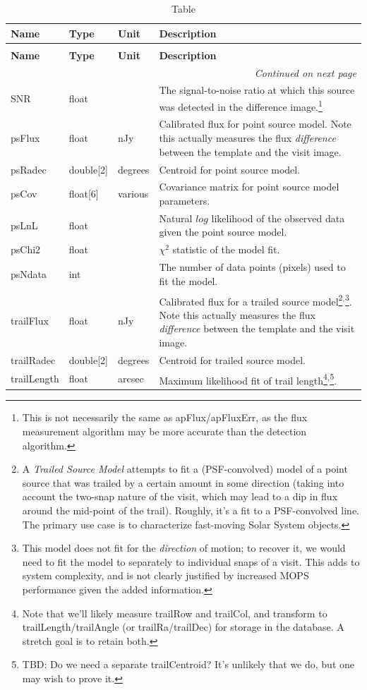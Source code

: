 \documentclass[SE,lsstdraft,toc]{lsstdoc}
\newenvironment{schema}[3]{%
\setlength\LTleft{0pt}
\setlength\LTright{\fill}
\begin{longtable}{p{0.2\textwidth}p{0.14\textwidth}p{0.14\textwidth}p{0.41\textwidth}}

\caption[#1]{#2\label{#3}}\\

\hline \textbf{Name} & \textbf{Type} & \textbf{Unit} & \textbf{Description}\\ \hline
\endfirsthead

\caption[#1]{#2}\\

\hline \textbf{Name} & \textbf{Type} & \textbf{Unit} & \textbf{Description}\\ \hline
\endhead

\hline \multicolumn{4}{r}{\emph{Continued on next page}} \\
\endfoot

\hline\hline
\endlastfoot
}{%
\hline
\end{longtable}
}
\begin{document}
\begin{schema}{\DIASource Table}{\DIASource Table}{tbl:diasourceTable}
SNR & float & ~ & The signal-to-noise ratio at which this source was detected in the difference image.\footnote{This is not necessarily the same as apFlux/apFluxErr, as the flux measurement algorithm may be more accurate than the detection algorithm.} \\

psFlux & float & nJy & Calibrated flux for point source model. Note this actually measures the flux \emph{difference} between the template and the visit image. \\

psRadec & double[2] & degrees & Centroid for point source model. \\

psCov & float[6] & various & Covariance matrix for point source model parameters. \\

psLnL & float & ~ & Natural $log$ likelihood of the observed data given the point source model. \\

psChi2 & float & ~ & $\chi^2$ statistic of the model fit. \\

psNdata & int & ~ & The number of data points (pixels) used to fit the model. \\

trailFlux & float & nJy & Calibrated flux for a trailed source model\footnote{A \emph{Trailed Source Model} attempts to fit a (PSF-convolved) model of a point source that was trailed by a certain amount in some direction (taking into account the two-snap nature of the visit, which may lead to a dip in flux around the mid-point of the trail). Roughly, it's a fit to a PSF-convolved line. The primary use case is to characterize fast-moving Solar System objects.}$^,$\footnote{This model does not fit for the \emph{direction} of motion; to recover it, we would need to fit the model to separately to individual snaps of a visit. This adds to system complexity, and is not clearly justified by increased MOPS performance given the added information.}. Note this actually measures the flux \emph{difference} between the template and the visit image. \\

trailRadec & double[2] & degrees & Centroid for trailed source model. \\

trailLength & float & arcsec & Maximum likelihood fit of trail length\footnote{Note that we'll likely measure trailRow and trailCol, and transform to trailLength/trailAngle (or trailRa/trailDec) for storage in the database. A stretch goal is to retain both.}$^,$\footnote{TBD: Do we need a separate trailCentroid? It's unlikely that we do, but one may wish to prove it.}. \\


\end{schema}
\end{document}
